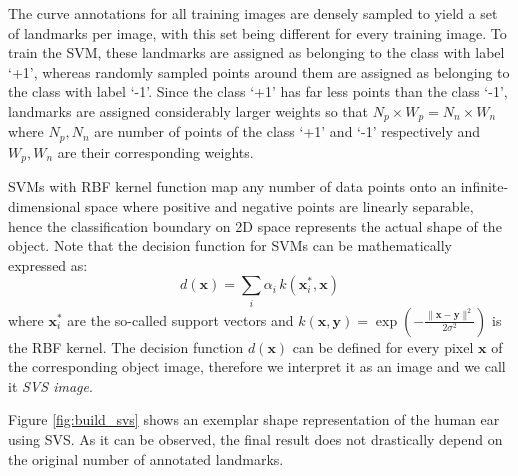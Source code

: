 The curve annotations for all training images are densely sampled to yield a set of landmarks per image, with this set being different for every training image. To train the SVM, these landmarks are assigned as belonging to the class with label `+1', whereas randomly sampled points around them are assigned as belonging to the class with label `-1'. Since the class `+1' has far less points than the class `-1', landmarks are assigned considerably larger weights so that $N_p \times W_p=N_n \times W_n$ where $N_p, N_n$ are number of points of the class `+1' and `-1' respectively and $W_p, W_n$ are their corresponding weights.

SVMs with RBF kernel function map any number of data points onto an infinite-dimensional space where positive and negative points are linearly separable, hence the classification boundary on 2D space represents the actual shape of the object. Note that the decision function for SVMs can be mathematically expressed as:
\begin{equation} \label{eq:decisionfunc}
    d(\bm{x})=\sum_i\alpha_i \, k(\bm{x}_i^*,\bm{x})
\end{equation}
where $\bm{x}_i^*$ are the so-called support vectors and \mbox{$k(\bm{x}, \bm{y}) = \exp\left(-\frac{\|\bm{x} -\bm{y}\|^2}{2 \sigma^2}\right)$} is the RBF kernel. The decision function $d(\bm{x})$ can be defined for every pixel $\bm{x}$ of the corresponding object image, therefore we interpret it as an image and we call it \emph{SVS image}.


Figure \ref{fig:build_svs} shows an exemplar shape representation of the human ear using SVS. As it can be observed, the final result does not drastically depend on the original number of annotated landmarks.



